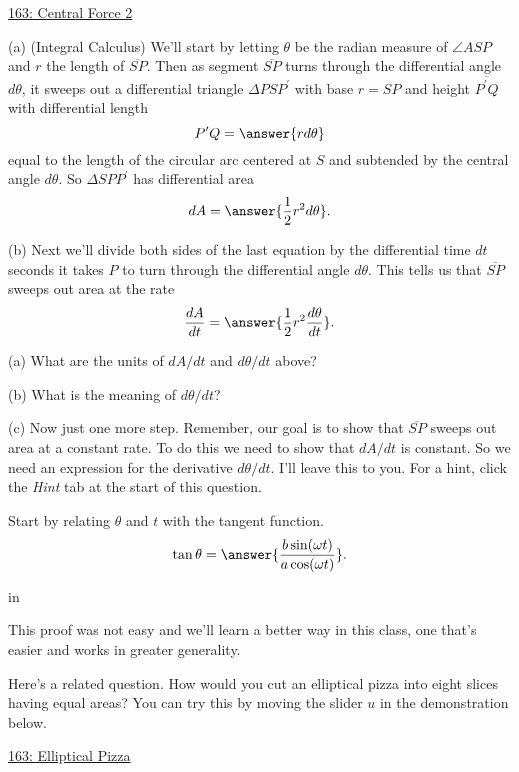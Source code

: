 \documentclass{ximera}
\newcommand{\pskip}{\vskip 0.1 in}
\begin{document}
\href{https://www.desmos.com/calculator/6woyc0rx1b}{163: Central Force 2}



\begin{question}  \label{Qdf4t5tht5544}
(a) (Integral Calculus) We'll start by letting $\theta$ be the radian measure of $\angle ASP$ and $r$ the length of $\overline{SP}$. Then as segment $\overline{SP}$ turns through the differential angle $d\theta$, it sweeps out
a differential triangle $\Delta PSP^\prime$  with base $r=SP$ and height $\overline{P^\prime Q}$ with differential length
\[
             P^\prime Q = \answer{r d\theta}
\]
equal to the length of the circular arc centered at $S$ and subtended by the central angle $d\theta$. So $\Delta SPP^\prime$ has differential area
\[
    dA = \answer{\frac{1}{2}r^2 d\theta} .
\]

(b) Next we'll divide both sides of the last equation by the differential time $dt$ seconds it takes $P$ to turn through the differential angle $d\theta$. This tells us that $\overline{SP}$ sweeps out area at the rate
\[
  \frac{dA}{dt} = \answer{\frac{1}{2}r^2 \frac{d\theta}{dt}} .
\]

\begin{freeResponse}
(a) What are the units of $dA/dt$ and $d\theta/dt$ above? 

(b) What is the meaning of $d\theta/dt$?
\end{freeResponse}

(c) Now just one more step. Remember, our goal is to show that $\overline{SP}$ sweeps out area at a constant rate. To do this we need to show that $dA/dt$ is constant. So we need an expression for the derivative $d\theta/dt$. I'll leave this to you. For a hint, click the \emph{Hint} tab at the start of this question.

\begin{hint}
Start by relating $\theta$ and $t$ with the tangent function. %
\[
    \tan \theta = \answer{ \frac{b\sin (\omega t)}{a \cos (\omega t)}} .
\]
\end{hint}

\pskip

This proof was not easy and we'll learn a better way in this class, one that's easier and works in greater generality.

\begin{freeResponse}   \label{Q:L98d7g33}
Here's a related question. How would you cut an elliptical pizza into eight slices having equal areas? You can try this by moving the slider $u$ in the demonstration below.

\begin{onlineOnly}
    \begin{center}
\end{center}
\end{onlineOnly}

\href{https://www.desmos.com/calculator/urbwsy8zqw}{163: Elliptical Pizza}





\end{freeResponse}


\end{question}
\end{document}
